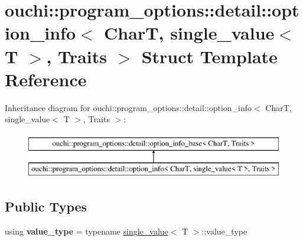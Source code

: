 \hypertarget{structouchi_1_1program__options_1_1detail_1_1option__info_3_01_char_t_00_01single__value_3_01_t_01_4_00_01_traits_01_4}{}\section{ouchi\+::program\+\_\+options\+::detail\+::option\+\_\+info$<$ CharT, single\+\_\+value$<$ T $>$, Traits $>$ Struct Template Reference}
\label{structouchi_1_1program__options_1_1detail_1_1option__info_3_01_char_t_00_01single__value_3_01_t_01_4_00_01_traits_01_4}
Inheritance diagram for ouchi\+::program\+\_\+options\+::detail\+::option\+\_\+info$<$ CharT, single\+\_\+value$<$ T $>$, Traits $>$\+:\begin{figure}[H]
\begin{center}
\leavevmode
\includegraphics[height=2.000000cm]{structouchi_1_1program__options_1_1detail_1_1option__info_3_01_char_t_00_01single__value_3_01_t_01_4_00_01_traits_01_4}
\end{center}
\end{figure}
\subsection*{Public Types}
\begin{DoxyCompactItemize}
\item 
\mbox{\label{structouchi_1_1program__options_1_1detail_1_1option__info_3_01_char_t_00_01single__value_3_01_t_01_4_00_01_traits_01_4_af7efdd2ecf247fc000432a3d6fcacd19}} 
using {\bfseries value\+\_\+type} = typename \mbox{\hyperlink{structouchi_1_1program__options_1_1detail_1_1single__value}{single\+\_\+value}}$<$ T $>$\+::value\+\_\+type
\end{DoxyCompactItemize}
